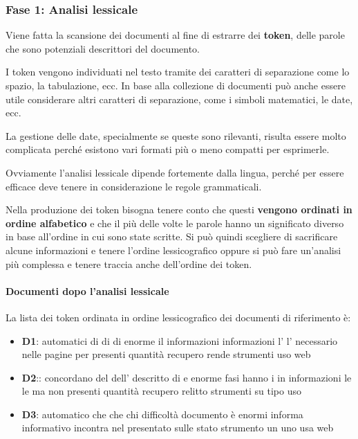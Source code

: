 \subsubsection{Fase 1: Analisi lessicale}

Viene fatta la scansione dei documenti al fine di estrarre dei \textbf{token}, delle parole che sono potenziali descrittori del documento.

I token vengono individuati nel testo tramite dei caratteri di separazione come lo spazio, la tabulazione, ecc. In base alla collezione di documenti può anche essere utile considerare altri caratteri di separazione, come i simboli matematici, le date, ecc.

La gestione delle date, specialmente se queste sono rilevanti, risulta essere molto complicata perché esistono vari formati più o meno compatti per esprimerle.

Ovviamente l'analisi lessicale dipende fortemente dalla lingua, perché per essere efficace deve tenere in considerazione le regole grammaticali.

Nella produzione dei token bisogna tenere conto che questi \textbf{vengono ordinati in ordine alfabetico} e che il più delle volte le parole hanno un significato diverso in base all'ordine in cui sono state scritte. 
Si può quindi scegliere di sacrificare alcune informazioni e tenere l'ordine lessicografico oppure si può fare un'analisi più complessa e tenere traccia anche dell'ordine dei token.

\paragraph{Documenti dopo l'analisi lessicale} La lista dei token ordinata in ordine lessicografico dei documenti di riferimento è:

\begin{itemize}
	\item \textbf{D1}: automatici di di di enorme il informazioni
	informazioni l' l' necessario nelle pagine per presenti quantità recupero rende strumenti uso web
	\item \textbf{D2}:: concordano del dell' descritto di e enorme fasi hanno i in informazioni le le ma non presenti quantità recupero relitto strumenti su tipo uso 
	\item \textbf{D3}: automatico che che chi difficoltà documento è enormi informa informativo incontra nel presentato sulle stato strumento un uno usa web 
\end{itemize}

